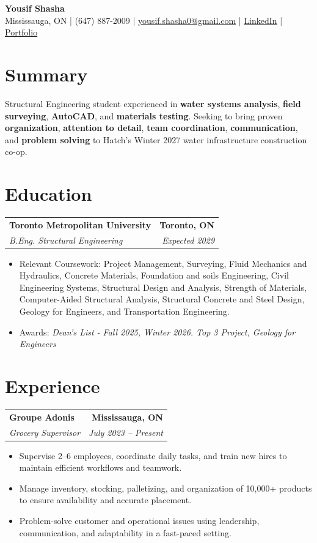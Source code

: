 \documentclass[11pt]{article}
\newcommand{\contact}[1]{\small #1}
\newcommand{\entry}[4]{%
  \begin{tabularx}{\textwidth}{X r}
    \textbf{#1} & \textbf{#2} \\
    \textit{#3} & \textit{#4} \\
  \end{tabularx}\vspace{-2pt}
}
\newcommand{\tightItem}[1]{\item \small #1}
\begin{document}
\begin{center}
{\LARGE \textbf{Yousif Shasha}}\\[4pt]
\contact{Mississauga, ON \;\;|\;\; (647) 887-2009 \;\;|\;\;
\href{mailto:yousif.shasha0@gmail.com}{yousif.shasha0@gmail.com} \;\;|\;\;
\href{https://www.linkedin.com/in/yousif-shasha-177412375}{LinkedIn}} 
\;\;|\;\;
\href{https://yousifshasha.github.io/Yousif-Shasha.github.io/}
{Portfolio}

\end{center}

\vspace{-4pt}

\section*{Summary}
\small{
Structural Engineering student experienced in \textbf{water systems analysis}, \textbf{field surveying}, \textbf{AutoCAD}, and \textbf{materials testing}. Seeking to bring proven \textbf{organization}, \textbf{attention to detail}, \textbf{team coordination}, \textbf{communication}, and \textbf{problem solving} to Hatch's Winter 2027 water infrastructure construction co-op.}

\section*{Education}
\entry
{Toronto Metropolitan University}{Toronto, ON}
{B.Eng. Structural Engineering}{Expected 2029}
\begin{itemize}
  \tightItem{Relevant Coursework: Project Management, Surveying, Fluid Mechanics and Hydraulics, Concrete Materials, Foundation and soils Engineering, Civil Engineering Systems, Structural Design and Analysis, Strength of Materials, Computer-Aided Structural Analysis, Structural Concrete and Steel Design, Geology for Engineers, and Transportation Engineering.}
  \tightItem{Awards: \textit{Dean's List - Fall 2025, Winter 2026. Top 3 Project, Geology for Engineers }}
\end{itemize}
\vspace{2pt}


\section*{Experience}
\entry
{Groupe Adonis}{Mississauga, ON}
{Grocery Supervisor }{July 2023 -- Present}
\begin{itemize}
  \tightItem{Supervise 2–6 employees, coordinate daily tasks, and train new hires to maintain efficient workflows and teamwork. }
  \tightItem{Manage inventory, stocking, palletizing, and organization of 10,000+ products to ensure availability and accurate placement.  }
  \tightItem{Problem-solve customer and operational issues using leadership, communication,  and adaptability in a fast-paced setting.
  }
  
\end{itemize}
\end{document}
